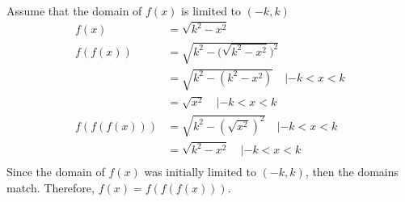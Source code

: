 \documentclass[12pt, letterpaper]{article}
\begin{document}
\paragraph{}
Assume that the domain of $f(x)$ is limited to $(-k, k)$
\begin{align*}
        f(x) &= \sqrt{k^2 - x^2} \\
        f(f(x)) &= \sqrt{k^2 - \Big( \sqrt{k^2-x^2} \Big)^2} \\
                &= \sqrt{k^2 - (k^2-x^2) } \quad | -k < x < k \\
                &= \sqrt{x^2} \quad | -k < x < k \\
        f(f(f(x))) &= \sqrt{k^2 - (\sqrt{x^2})^2} \quad | -k < x < k \\
                   &= \sqrt{k^2 - x^2} \quad | -k < x < k \\ 
\end{align*}
Since the domain of $f(x)$ was initially limited to $(-k, k)$, then the domains match. Therefore, $f(x) = f(f(f(x)))$.
\end{document}
